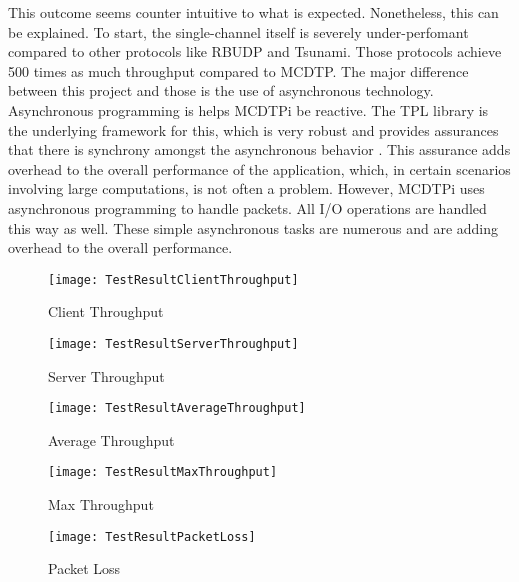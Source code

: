 This outcome seems counter intuitive to what is expected. Nonetheless, this can be explained. To start, the single-channel itself is severely under-perfomant compared to other protocols like RBUDP and Tsunami. Those protocols achieve 500 times as much throughput compared to MCDTP. The major difference between this project and those is the use of asynchronous technology. Asynchronous programming is helps MCDTPi be reactive. The TPL library is the underlying framework for this, which is very robust and provides assurances that there is synchrony amongst the asynchronous behavior \cite{Leijen2009}. This assurance adds overhead to the overall performance of the application, which, in certain scenarios involving large computations, is not often a problem. However, MCDTPi uses asynchronous programming to handle packets. All I/O operations are handled this way as well. These simple asynchronous tasks are numerous and are adding overhead to the overall performance.




\begin{figure}[ht]
\centering
\texttt{[image: TestResultClientThroughput]}
\caption{Client Throughput}
\label{fig:tr-ct}
\end{figure}

\begin{figure}[ht]
\centering
\texttt{[image: TestResultServerThroughput]}
\caption{Server Throughput}
\label{fig:tr-st}
\end{figure}

\begin{figure}[ht]
\centering
\texttt{[image: TestResultAverageThroughput]}
\caption{Average Throughput}
\label{fig:tr-at}
\end{figure}

\begin{figure}[ht]
\centering
\texttt{[image: TestResultMaxThroughput]}
\caption{Max Throughput}
\label{fig:tr-mt}
\end{figure}

\begin{figure}[ht]
\centering
\texttt{[image: TestResultPacketLoss]}
\caption{Packet Loss}
\label{fig:tr-pl}
\end{figure}
